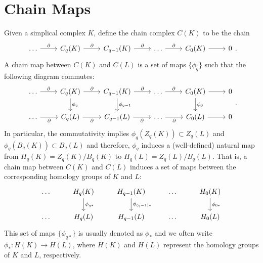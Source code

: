 \section{Chain Maps}
Given a simplical complex $K$, define the chain complex $C(K)$ to be the chain
\[
    \begin{tikzcd}
        \dots \arrow[r, "\partial"] & C_q(K) \arrow[r, "\partial"] & C_{q-1}(K) \arrow[r, "\partial"] & \dots \arrow[r, "\partial"] & C_0(K) \arrow[r] & 0
    \end{tikzcd}.
\]
A chain map between $C(K)$ and $C(L)$ is a set of maps $\{\phi_q\}$ such that the following diagram commutes:
\[
    \begin{tikzcd}
        \dots \arrow[r, "\partial"]  & C_q(K) \arrow[r, "\partial"] \arrow[d, "\phi_q"] & C_{q-1}(K) \arrow[r, "\partial"] \arrow[d, "\phi_{q-1}"] & \dots \arrow[r, "\partial"]  & C_0(K) \arrow[r] \arrow[d, "\phi_0"] & 0 \\
        \dots \arrow[r, "\partial"'] & C_q(L) \arrow[r, "\partial"']                 & C_{q-1}(L) \arrow[r, "\partial"']                     & \dots \arrow[r, "\partial"'] & C_0(L) \arrow[r]                  & 0
    \end{tikzcd}.
\]
In particular, the commutativity implies $\phi_q(Z_q(K)) \subset Z_q(L)$ and $\phi_q(B_q(K)) \subset B_q(L)$ and therefore, $\phi_q$ induces a (well-defined) natural map from $H_q(K) = Z_q(K) / B_q(K)$ to $H_q(L) = Z_q(L) / B_q(L)$. That is, a chain map between $C(K)$ and $C(L)$ induces a set of maps between the corresponding homology groups of $K$ and $L$:
\[
    \begin{tikzcd}
        \dots & H_q(K) \arrow[d, "\phi_{q*}"] & H_{q-1}(K) \arrow[d, "\phi_{(q-1)*}"] & \dots & H_0(K) \arrow[d, "\phi_{0*}"] \\
        \dots & H_q(L)                     & H_{q-1}(L)                         & \dots & H_0(L)                  
    \end{tikzcd}
\]
This set of maps $\{\phi_{q*}\}$ is usually denoted as $\phi_*$ and we often write $\phi_*: H(K) \to H(L)$, where $H(K)$ and $H(L)$ represent the homology groups of $K$ and $L$, respectively.